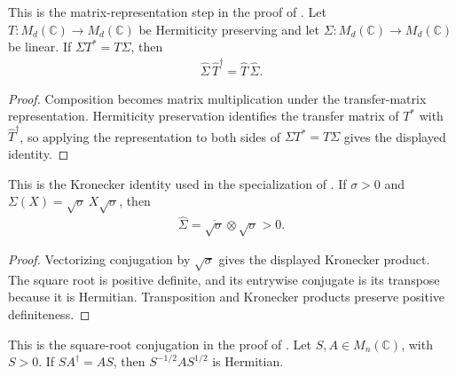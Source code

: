 
\begin{theorem}
    \label{thm:detailed_balance_transfer_matrix}
    \leanok
    This is the matrix-representation step in the proof of
    \cite[Chapter~8, Equation~(8.110)]{Wolf2012Quantum}.
    Let $T:M_d(\mathbb C)\to M_d(\mathbb C)$ be Hermiticity preserving and
    let $\Sigma:M_d(\mathbb C)\to M_d(\mathbb C)$ be linear.  If
    $\Sigma T^*=T\Sigma$, then
    \begin{align}
        \widehat\Sigma\,\widehat T^\dagger
        =\widehat T\,\widehat\Sigma.
    \end{align}
\end{theorem}

\begin{proof}
    \leanok
    Composition becomes matrix multiplication under the transfer-matrix
    representation.  Hermiticity preservation identifies the transfer matrix
    of $T^*$ with $\widehat T^\dagger$, so applying the representation to both
    sides of $\Sigma T^*=T\Sigma$ gives the displayed identity.
\end{proof}

\begin{theorem}
    \label{thm:sigma_sandwich_transfer_matrix}
    \leanok
    This is the Kronecker identity used in the specialization of
    \cite[Chapter~8, Proposition ``Jordan condition number and detailed balance'']{Wolf2012Quantum}.
    If $\sigma>0$ and
    $\Sigma(X)=\sqrt\sigma\,X\sqrt\sigma$, then
    \begin{align}
        \widehat\Sigma
        =\overline{\sqrt\sigma}\otimes\sqrt\sigma>0.
    \end{align}
\end{theorem}

\begin{proof}
    \leanok
    Vectorizing conjugation by $\sqrt\sigma$ gives the displayed Kronecker
    product.  The square root is positive definite, and its entrywise
    conjugate is its transpose because it is Hermitian.  Transposition and
    Kronecker products preserve positive definiteness.
\end{proof}

\begin{theorem}
    \label{thm:detailed_balance_hermitian_representative}
    \leanok
    This is the square-root conjugation in the proof of
    \cite[Chapter~8, Proposition ``Jordan condition number and detailed balance'']{Wolf2012Quantum}.
    Let $S,A\in M_n(\mathbb C)$, with $S>0$.  If
    $SA^\dagger=AS$, then
    $S^{-1/2}AS^{1/2}$ is Hermitian.
\end{theorem}

